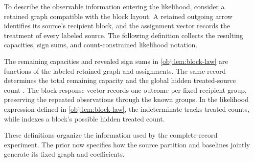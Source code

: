 \documentclass[11pt]{article}
\begin{document}
To describe the observable information entering the likelihood, consider a retained graph compatible with the block layout. A retained outgoing arrow identifies its source's recipient block, and the assignment vector records the treatment of every labeled source. The following definition collects the resulting capacities, sign sums, and count-constrained likelihood notation.



The remaining capacities  and revealed sign sums  in \cref{obj:lem:block-law} are functions of the labeled retained graph and assignments. The same record determines the total remaining capacity  and the global hidden treated-source count . The block-response vector  records one outcome per fixed recipient group, preserving the repeated observations through the known groups. In the likelihood expression  defined in \cref{obj:lem:block-law}, the indeterminate  tracks treated counts, while  indexes a block's possible hidden treated count.

These definitions organize the information used by the complete-record experiment. The prior now specifies how the source partition and baselines jointly generate its fixed graph and coefficients.
\end{document}
